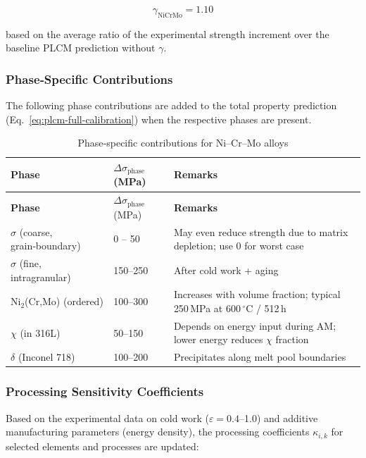 \documentclass[12pt,a4paper]{article}
\begin{document}
	\[
	\gamma_{\text{NiCrMo}} = 1.10
	\]
	
	based on the average ratio of the experimental strength increment over the baseline PLCM prediction without \(\gamma\).
	
	\subsubsection{Phase‑Specific Contributions}
	The following phase contributions are added to the total property prediction (Eq.~\ref{eq:plcm-full-calibration}) when the respective phases are present.
	
	\begin{longtable}{p{3.5cm} p{3.0cm} p{4.0cm}}
		\caption{Phase‑specific contributions for Ni–Cr–Mo alloys}\label{tab:nicrmo_phase_contrib}\\
		\toprule
		\textbf{Phase} & \(\Delta\sigma_{\text{phase}}\) (MPa) & \textbf{Remarks} \\
		\midrule
		\endfirsthead
		\toprule
		\textbf{Phase} & \(\Delta\sigma_{\text{phase}}\) (MPa) & \textbf{Remarks} \\
		\midrule
		\endhead
		\(\sigma\) (coarse, grain‑boundary) & 0 – 50 & May even reduce strength due to matrix depletion; use 0 for worst case \\
		\(\sigma\) (fine, intragranular) & 150–250 & After cold work + aging \\
		Ni\(_2\)(Cr,Mo) (ordered) & 100–300 & Increases with volume fraction; typical 250\,MPa at 600\,\(^{\circ}\)C / 512\,h \\
		\(\chi\) (in 316L) & 50–150 & Depends on energy input during AM; lower energy reduces \(\chi\) fraction \\
		\(\delta\) (Inconel 718) & 100–200 & Precipitates along melt pool boundaries \\
		\bottomrule
	\end{longtable}
	
	\subsubsection{Processing Sensitivity Coefficients}
	Based on the experimental data on cold work (\(\varepsilon=0.4\)–1.0) and additive manufacturing parameters (energy density), the processing coefficients \(\kappa_{i,k}\) for selected elements and processes are updated:
	
\end{document}
